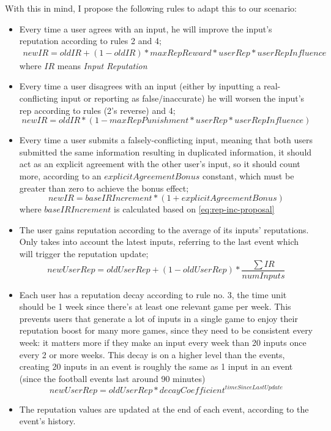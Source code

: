 With this in mind, I propose the following rules to adapt this to our scenario:

\begin{itemize}
    \item Every time a user agrees with an input, he will improve the input's reputation according to rules 2 and 4;
    \begin{multline} \label{eq:rep-inc-proposal}
        newIR = oldIR + (1 - oldIR) * maxRepReward * userRep * userRepInfluence
    \end{multline}
    where $IR$ means \textit{Input Reputation}
    \item Every time a user disagrees with an input (either by inputting a real-conflicting input or reporting as false/inaccurate) he will worsen the input's rep according to rules (2's reverse) and 4;
    \begin{equation}
        newIR = oldIR * (1 - maxRepPunishment * userRep * userRepInfluence)
    \end{equation}
    \item Every time a user submits a falsely-conflicting input, meaning that both users submitted the same information resulting in duplicated information, it should act as an explicit agreement with the other user's input, so it should count more, according to an $explicitAgreementBonus$ constant, which must be greater than zero to achieve the bonus effect;
    \begin{equation}
    newIR = baseIRIncrement * (1 + explicitAgreementBonus)
    \end{equation}
    where $baseIRIncrement$ is calculated based on \ref{eq:rep-inc-proposal}
    \item The user gains reputation according to the average of its inputs' reputations. Only takes into account the latest inputs, referring to the last event which will trigger the reputation update;
    \begin{equation}
        newUserRep = oldUserRep + (1 - oldUserRep) * \frac{\sum IR}{numInputs}
    \end{equation}
    \item Each user has a reputation decay according to rule no. 3, the time unit should be 1 week since there's at least one relevant game per week. This prevents users that generate a lot of inputs in a single game to enjoy their reputation boost for many more games, since they need to be consistent every week: it matters more if they make an input every week than 20 inputs once every 2 or more weeks.
    This decay is on a higher level than the events, creating 20 inputs in an event is roughly the same as 1 input in an event (since the football events last around 90 minutes)
    \begin{equation}
        newUserRep = oldUserRep * decayCoefficient^{timeSinceLastUpdate}
    \end{equation}
    \item The reputation values are updated at the end of each event, according to the event's history.
\end{itemize}


